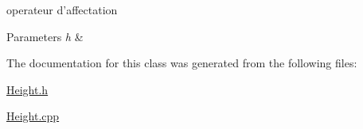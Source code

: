 operateur d'affectation 


\begin{DoxyParams}{Parameters}
{\em h} & \\
\hline
\end{DoxyParams}


The documentation for this class was generated from the following files\-:\begin{DoxyCompactItemize}
\item 
\hyperlink{Height_8h}{Height.\-h}\item 
\hyperlink{Height_8cpp}{Height.\-cpp}\end{DoxyCompactItemize}
